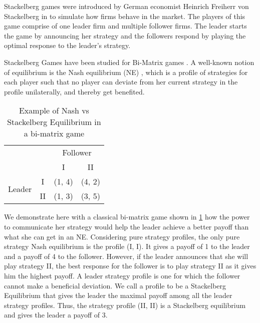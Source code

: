 
Stackelberg games were introduced by German economist Heinrich Freiherr von Stackelberg in \cite{S34} to simulate how firms behave in the market. The players of this game comprise of one leader firm and multiple follower firms. The leader starts the game by announcing her strategy and the followers respond by playing the optimal response to the leader's strategy.

Stackelberg Games have been studied for Bi-Matrix games \cite{GS18}. A well-known notion of equilibrium is the Nash equilibrium (NE) \cite{Nash50}, which is a profile of strategies for each player such that no player can deviate from her current strategy in the profile unilaterally, and thereby get benefited.

\begin{table}[]
    \centering
    \begin{tabular}{ll|c|c|}
        \cline{3-4}
        & & \multicolumn{2}{c|}{Follower} \\ 
        \cline{3-4} 
        & & I & II \\ 
        \hline
        \multicolumn{1}{|c|}{\multirow{2}{*}{Leader}} & \multicolumn{1}{c|}{I}  & (1, 4) & (4, 2)\\ 
        \cline{2-4} 
        \multicolumn{1}{|c|}{} & \multicolumn{1}{c|}{II} & (1, 3) & (3, 5) \\
        \hline
    \end{tabular}
    \caption{Example of Nash vs Stackelberg Equilibrium in a bi-matrix game}
    \label{tab:bi-matrix-game}
\end{table}

We demonstrate here with a classical bi-matrix game shown in \cref{tab:bi-matrix-game} how the power to communicate her strategy would help the leader achieve a better payoff than what she can get in an NE. Considering pure strategy profiles, the only pure strategy Nash equilibrium is the profile (I, I). It gives a payoff of 1 to the leader and a payoff of 4 to the follower. However, if the leader announces that she will play strategy II, the best response for the follower is to play strategy II as it gives him the highest payoff. A leader strategy profile \cite{GS18} is one for which the follower cannot make a beneficial deviation. We call a profile to be a Stackelberg Equilibrium that gives the leader the maximal payoff among all the leader strategy profiles. Thus, the strategy profile (II, II) is a Stackelberg equilibrium and gives the leader a payoff of 3.

